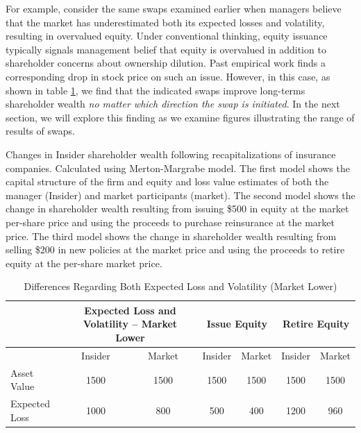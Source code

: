 For example, consider the same swaps examined earlier when managers believe that the market has underestimated both its expected losses and volatility, resulting in overvalued equity.  Under conventional thinking, equity issuance typically signals management belief that equity is overvalued in addition to shareholder concerns about ownership dilution.  Past empirical work finds a corresponding drop in stock price on such an issue.  However, in this case, as shown in table \ref{tab:bothunder}, we find that the indicated swaps improve long-terms shareholder wealth \textit{no matter which direction the swap is initiated}.  In the next section, we will explore this finding as we examine figures illustrating the range of results of swaps.

\begin{table}\caption{Differences Regarding Both Expected Loss and Volatility (Market Lower)\label{tab:bothunder}}
\begin{small}Changes in Insider shareholder wealth following recapitalizations of insurance companies.  Calculated using Merton-Margrabe model.  The first model shows the capital structure of the firm and equity and loss value estimates of both the manager (Insider) and market participants (market).  The second model shows the change in shareholder wealth resulting from issuing \$500 in equity at the market per-share price and using the proceeds to purchase reinsurance at the market price.  The third model shows the change in shareholder wealth resulting from selling \$200 in new policies at the market price and using the proceeds to retire equity at the per-share market price.\end{small}
\begin{center}
\begin{tabular}{p{2in}cccccc}
\toprule
           & \multicolumn{ 2}{p{2in}}{Expected Loss and Volatility -- Market Lower} & \multicolumn{ 2}{c}{Issue Equity} & \multicolumn{ 2}{c}{Retire Equity} \\ \midrule

           &  Insider &     Market &  Insider &     Market &  Insider &     Market \\ 
\midrule
\midrule

Asset Value &       1500 &       1500 &       1500 &       1500 &       1500 &       1500 \\ 

Expected Loss &       1000 &        800 &        500 &        400 &       1200 &       960 \\ 


\end{tabular}
\end{center}
\end{table}
